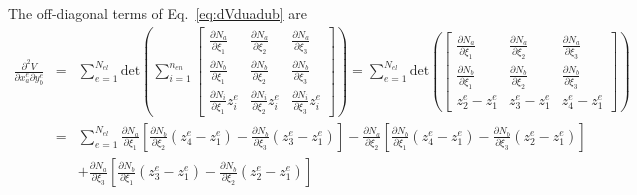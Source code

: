 \documentclass[12pt,aps,pre]{revtex4}
\begin{document}
The off-diagonal terms of Eq.\ \eqref{eq:dVduadub} are
%
\begin{eqnarray}
\frac{\partial^2 V}{\partial x_a^e \partial y_b^e} &=& \sum_{e=1}^{N_{el}} \text{det}\left(\sum_{i=1}^{n_{en}}
%
\begin{bmatrix}
\frac{\partial N_a}{\partial \xi_1}  & \frac{\partial N_a}{\partial \xi_2} & \frac{\partial N_a}{\partial \xi_3}  \\
%
\frac{\partial N_b}{\partial \xi_1}  & \frac{\partial N_b}{\partial \xi_2} & \frac{\partial N_b}{\partial \xi_3}  \\
%
\frac{\partial N_i}{\partial \xi_1}z_i^e  & \frac{\partial N_i}{\partial \xi_2}z_i^e & \frac{\partial N_i}{\partial \xi_3}z_i^e 
\end{bmatrix}\right) 
%
= \sum_{e=1}^{N_{el}} \text{det}\left(
%
\begin{bmatrix}
\frac{\partial N_a}{\partial \xi_1}  & \frac{\partial N_a}{\partial \xi_2} & \frac{\partial N_a}{\partial \xi_3}  \\
%
\frac{\partial N_b}{\partial \xi_1}  & \frac{\partial N_b}{\partial \xi_2} & \frac{\partial N_b}{\partial \xi_3}  \\
%
z_2^e - z_1^e & z_3^e - z_1^e & z_4^e - z_1^e 
\end{bmatrix}\right)\nonumber\\
&=& \sum_{e=1}^{N_{el}}\frac{\partial N_a}{\partial \xi_1}\left[\frac{\partial N_b}{\partial \xi_2}(z_4^e - z_1^e)-\frac{\partial N_b}{\partial \xi_3}(z_3^e - z_1^e)\right]
%
-\frac{\partial N_a}{\partial \xi_2}\left[\frac{\partial N_b}{\partial \xi_1}(z_4^e - z_1^e)-\frac{\partial N_b}{\partial \xi_3}(z_2^e - z_1^e)\right] \nonumber\\
%
&&+\frac{\partial N_a}{\partial \xi_3}\left[\frac{\partial N_b}{\partial \xi_1}(z_3^e - z_1^e)-\frac{\partial N_b}{\partial \xi_2}(z_2^e - z_1^e)\right] 
\end{eqnarray}
\end{document}

